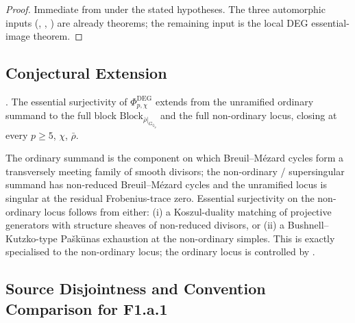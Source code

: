 \begin{proof}
Immediate from  under the
stated hypotheses. The three automorphic inputs
(,
,
) are already theorems; the
remaining input is the local DEG essential-image theorem.
\end{proof}

\subsection{Conjectural Extension}

\begin{conjecture}
\label{v4-arith:w5-e:conj:f1a1-full}
\ClaimStatusConjectured. The essential surjectivity of
\(\Phi^{\mathrm{DEG}}_{p,\chi}\) extends from the unramified ordinary
summand to the full block
\(\mathrm{Block}_{\bar\rho|_{G_{\mathbb{Q}_{p}}}}\) and the full
non-ordinary locus, closing
 at every
\(p\geq 5\), \(\chi\), \(\bar\rho\).
\end{conjecture}

\begin{remark}
\label{v4-arith:w5-e:rem:f1a1-residual}
The ordinary summand is the component on which Breuil--M{\'e}zard
cycles form a transversely meeting family of smooth divisors; the
non-ordinary / supersingular summand has non-reduced
Breuil--M{\'e}zard cycles and the unramified locus is singular at
the residual Frobenius-trace zero. Essential surjectivity on the
non-ordinary locus follows from either: (i) a Koszul-duality matching
of projective generators with structure sheaves of non-reduced
divisors, or (ii) a Bushnell--Kutzko-type Pa{\v s}k{\=u}nas exhaustion
at the non-ordinary simples. This is exactly
 specialised to the
non-ordinary locus; the ordinary locus is controlled by
.
\end{remark}

\subsection{Source Disjointness and Convention Comparison for F1.a.1}

